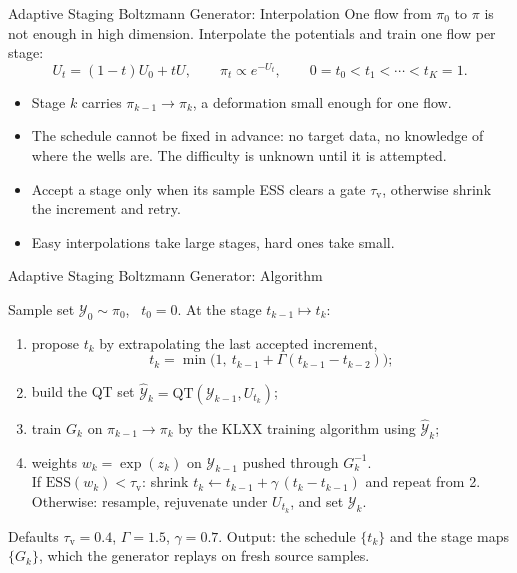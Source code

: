 \documentclass{beamer}
\newcommand{\red}{\color{red!80!black}}
\newcommand{\blue}{\color{blue!90!black}}
\newcommand{\ESS}{\mathrm{ESS}}
\begin{document}
\begin{frame}{Adaptive Staging Boltzmann Generator: Interpolation}
	\small
	One flow from $\pi_0$ to $\pi$ is not enough in high dimension. Interpolate the potentials and train one flow per {\blue stage}:
	\begin{equation*}
		U_t = (1-t)U_0 + tU , \qquad \pi_t \propto e^{-U_t} , \qquad
		0 = t_0 < t_1 < \cdots < t_K = 1 .
	\end{equation*}
	\vspace{-0.5cm}
	\begin{itemize}
		\setlength{\itemsep}{6pt}
		\item Stage $k$ carries $\pi_{k-1}\to\pi_k$, a deformation small enough for one flow.
		\item The schedule cannot be fixed in advance: no target data, no knowledge of where the wells are. The difficulty is unknown until it is attempted.
		\item {\red Accept a stage only when its sample ESS clears a gate $\tau_{\mathrm v}$}, otherwise shrink the increment and retry.
		\item Easy interpolations take large stages, hard ones take small.
	\end{itemize}
\end{frame}

\begin{frame}{Adaptive Staging Boltzmann Generator: Algorithm}
	\small
	\begin{tcolorbox}[colback=gray!8,colframe=gray!45,boxrule=0.5pt,arc=2pt,
		left=6pt,right=6pt,top=5pt,bottom=5pt]
		Sample set $\mathcal Y_0\sim\pi_0$, \ $t_0=0$. At the stage $t_{k-1}\mapsto t_k$:
		\begin{enumerate}
			\setlength{\itemsep}{4pt}
			\item propose $t_k$ by extrapolating the last accepted increment,
			$$
			t_k = \min\bigl(1,\ t_{k-1}+\Gamma(t_{k-1}-t_{k-2})\bigr);
			$$
			\item build the {\red QT set} $\hat{\mathcal Y}_k = \mathrm{QT}(\mathcal Y_{k-1},U_{t_k})$; \qquad {\blue (prebuilt before training)}
			\item train $G_k$ on $\pi_{k-1}\to\pi_k$ by the KLXX training algorithm using $\hat{\mathcal Y}_k$;
			\item weights $w_k = \exp(z_k)$ on $\mathcal Y_{k-1}$ pushed through $G_k^{-1}$.
			\\[4pt]
			If $\ESS(w_k)<\tau_{\mathrm v}$: shrink $t_k \gets t_{k-1}+\gamma\,(t_k-t_{k-1})$ and repeat from 2.
			\\[4pt]
			Otherwise: resample, rejuvenate under $U_{t_k}$, and set $\mathcal Y_k$.
		\end{enumerate}
	\end{tcolorbox}
	\vspace{2pt}
	Defaults $\tau_{\mathrm v}=0.4$, $\Gamma=1.5$, $\gamma=0.7$. Output: the schedule $\{t_k\}$ and the stage maps $\{G_k\}$, which the generator replays on fresh source samples.
\end{frame}
\end{document}
